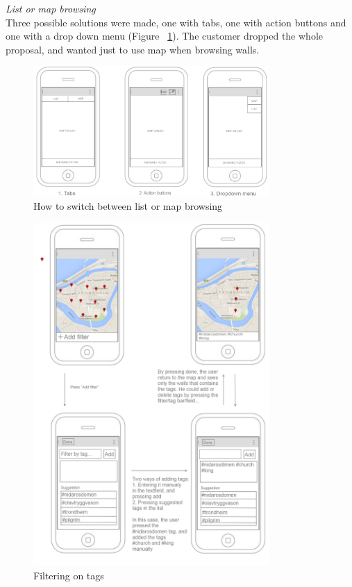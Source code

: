 \documentclass[11pt]{book}
\begin{document}
\textit{List or map browsing}\\
Three possible solutions were made, one with tabs, one with action buttons and one with a drop down menu (Figure ~\ref{fig:phases_sprint1_uiVersionTwoAccessListOrMap}). The customer dropped the whole proposal, and wanted just to use map when browsing walls.

\begin{figure}[H]
    \centering
    \includegraphics[width=0.8\textwidth]{Figures/Phases/Sprint1/accessListOrMap.png}
    \caption{How to switch between list or map browsing}
    \label{fig:phases_sprint1_uiVersionTwoAccessListOrMap}
\end{figure}

\begin{figure}[H]
    \centering
    \includegraphics[width=0.8\textwidth]{Figures/Phases/Sprint1/addFilter.png}
    \caption{Filtering on tags}
    \label{fig:phases_sprint1_uiVersionTwoAddFilter}
\end{figure}
\end{document}
